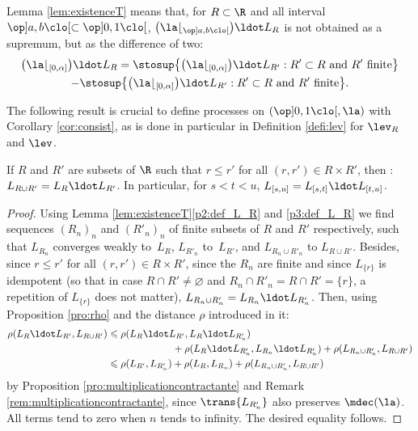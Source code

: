 \begin{rem}\label{rem:difference} Lemma \ref{lem:existenceT} means that, for $R\subset \R$ and all interval $\op]a,b\clo[\subset\op]0,1\clo[$, $\bigl(\la\lfloor_{\op]a,b\clo[}\bigr)\ldot L_{R}$ is not obtained as a supremum, but as the difference of two:
\begin{multline*}
\bigl(\la\lfloor_{[0,\alpha]}\bigr)\ldot L_{R}=\stosup\bigl\{\bigl(\la\lfloor_{[0,\alpha]}\bigr)\ldot L_{R'}:R'\subset R\ \text{and $R'$ finite}\bigr\}\\
- \stosup\bigl\{\bigl(\la\lfloor_{[0,\alpha]}\bigr)\ldot L_{R'}:R'\subset R\ \text{and $R'$ finite}\bigr\}.
\end{multline*}
\end{rem}

The following result is crucial to define processes on $(\op]0,1\clo[,\la)$ with Corollary \ref{cor:consist}, as is done in particular in Definition \ref{defi:lev} for $\lev_R$ and $\lev$.
\begin{pro}\label{pro:compo}If $R$ and $R'$ are subsets of $\R$ such that $r\leqslant r'$ for all $(r,r')\in R\times R'$, then
: $L_{R\cup R'}=L_{R}{}\ldot L_{R'}$.
In particular, for $s<t<u$, $L_{[s,u]}=L_{[s,t]}{}\ldot L_{[t,u]}$.
\end{pro}
\begin{proof} Using Lemma \ref{lem:existenceT}\eqref{p2:def_L_R} and \eqref{p3:def_L_R} we find sequences $(R_n)_n$ and $(R'_n)_n$ of finite subsets of $R$ and $R'$ respectively, such that $L_{R_n}$ converges weakly to~$L_R$, $L_{R'_n}$ to~$L_{R'}$, and $L_{R_n\cup R'_n}$ to $L_{R\cup R'}$. Besides, since $r\leqslant r'$ for all $(r,r')\in R\times R'$, since the $R_n$ are finite and since $L_{\{r\}}$ is idempotent (so that in case $R\cap R'\neq\varnothing$ and $R_n\cap R'_n=R\cap R'=\{r\}$, a repetition of $L_{\{r\}}$ does not matter), $L_{R_n\cup R'_n}=L_{R_n}{}\ldot L_{R'_n}$. Then, using Proposition \ref{pro:rho} and the distance $\rho$ introduced in it:
\begin{align*}
\rho(L_R\ldot L_{R'},L_{R\cup R'})&\leqslant\rho(L_R\ldot L_{R'},L_R\ldot L_{R'_n})\\
&\hspace*{2.3cm}+\rho(L_R\ldot L_{R'_n},L_{R_n}{}\ldot L_{R'_n})+\rho(L_{R_n\cup R'_n},L_{R\cup R'})\\
&\leqslant\rho(L_{R'},L_{R'_n})+\rho(L_R,L_{R_n})+\rho(L_{R_n\cup R'_n},L_{R\cup R'})
\end{align*}
by Proposition \ref{pro:multiplicationcontractante} and Remark \ref{rem:multiplicationcontractante}, since $\trans{L_{R'_n}}$ also preserves $\mdec(\la)$. All terms tend to zero when $n$ tends to infinity. The desired equality follows.
\end{proof}

